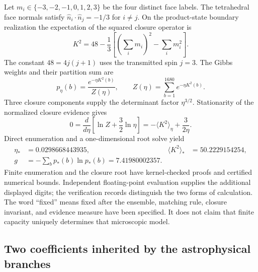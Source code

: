 Let $m_i\in\{-3,-2,-1,0,1,2,3\}$ be the four distinct face labels.
The tetrahedral face normals satisfy
$\widehat n_i\cdot\widehat n_j=-1/3$ for $i\ne j$. On the product-state
boundary realization the expectation of the squared closure operator is
\begin{equation}
K^2=48-\frac13\left[\left(\sum_i m_i\right)^2-\sum_i m_i^2\right].
\label{eq:K}
\end{equation}
The constant $48=4j(j+1)$ uses the transmitted spin $j=3$.
The Gibbs weights and their partition sum are
\begin{equation}
p_\eta(b)=\frac{e^{-\eta K^2(b)}}{Z(\eta)},\qquad
Z(\eta)=\sum_{b=1}^{1680}e^{-\eta K^2(b)}.
\end{equation}
Three closure components supply the determinant factor $\eta^{3/2}$.
Stationarity of the normalized closure evidence gives
\begin{equation}
0=\frac{d}{d\eta}\left[\ln Z+\frac32\ln\eta\right]
=-\langle K^2\rangle_\eta+\frac{3}{2\eta}.
\end{equation}
Direct enumeration and a one-dimensional root solve yield
\begin{align}
\eta_*&=0.0298668443935, & \langle K^2\rangle_*&=50.2229154254,\\
g&=-\sum_b p_*(b)\ln p_*(b)=7.41980002357.
\label{eq:g}
\end{align}
Finite enumeration and the closure root have kernel-checked proofs and
certified numerical bounds. Independent floating-point evaluation supplies
the additional displayed digits; the verification records distinguish the
two forms of calculation. 
The word ``fixed'' means fixed after the ensemble, matching rule,
closure invariant, and evidence measure have been specified. It does not
claim that finite capacity uniquely determines that microscopic model.

\subsection{Two coefficients inherited by the astrophysical branches}

